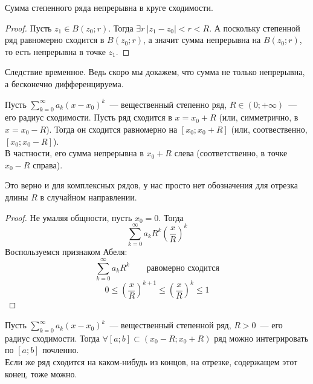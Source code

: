 \documentclass{article}
\begin{document}
    \begin{corollary}
        Сумма степенного ряда непрерывна в круге сходимости.
    \end{corollary}
    \begin{proof}
        Пусть $z_1\in B(z_0;r)$. Тогда $\exists r~|z_1-z_0|<r<R$. А поскольку степенной ряд равномерно сходится в $B(z_0;r)$, а значит сумма непрерывна на $B(z_0;r)$, то есть непрерывна в точке $z_1$.
    \end{proof}
    \begin{remark}
        Следствие временное. Ведь скоро мы докажем, что сумма не только непрерывна, а бесконечно дифференцируема.
    \end{remark}
    \begin{theorem}
        \label{Теорема Абеля о степенных рядах}
        Пусть $\sum\limits_{k=0}^\infty a_k(x-x_0)^k$~--- вещественный степенно ряд, $R\in(0;+\infty)$~--- его радиус сходимости. Пусть ряд сходится в $x=x_0+R$ (или, симметрично, в $x=x_0-R$). Тогда он сходится равномерно на $[x_0;x_0+R]$ (или, соотвественно, $[x_0;x_0-R]$).\\
        В частности, его сумма непрерывна в $x_0+R$ слева (соответственно, в точке $x_0-R$ справа).
    \end{theorem}
    \begin{remark}
        Это верно и для комплексных рядов, у нас просто нет обозначения для отрезка длины $R$ в случайном направлении.
    \end{remark}
    \begin{proof}
        Не умаляя общности, пусть $x_0=0$. Тогда
        $$
        \sum\limits_{k=0}^\infty a_kR^k\left(\frac xR\right)^k
        $$
        Воспользуемся признаком Абеля:
        $$
        \sum\limits_{k=0}^\infty a_kR^k\qquad\text{равомерно сходится}
        $$
        $$
        0\leqslant\left(\frac xR\right)^{k+1}\leqslant\left(\frac xR\right)^k\leqslant1
        $$
    \end{proof}
    \begin{corollary}
        \label{Интегрирование степенных рядов}
        Пусть $\sum\limits_{k=0}^\infty a_k(x-x_0)^k$~--- вещественный степенной ряд, $R>0$~--- его радиус сходимости. Тогда $\forall[a;b]\subset(x_0-R;x_0+R)$ ряд можно интегрировать по $[a;b]$ почленно.\\
        Если же ряд сходится на каком-нибудь из концов, на отрезке, содержащем этот конец, тоже можно.
    \end{corollary}
\end{document}
